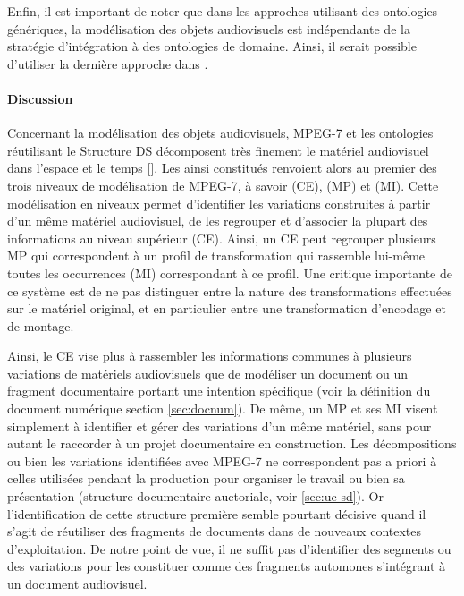 Enfin, il est important de noter que dans les approches utilisant des ontologies génériques, la modélisation des objets audiovisuels est indépendante de la stratégie d'intégration à des ontologies de domaine.
Ainsi, il serait possible d'utiliser la dernière approche dans .

\paragraph{Discussion}
Concernant la modélisation des objets audiovisuels, MPEG-7 et les ontologies réutilisant le Structure DS décomposent très finement le matériel audiovisuel dans l'espace et le temps [].
Les  ainsi constitués renvoient alors au premier des trois niveaux de modélisation de MPEG-7, à savoir  (CE),  (MP) et  (MI).
Cette modélisation en niveaux permet d'identifier les variations construites à partir d'un même matériel audiovisuel, de les regrouper et d'associer la plupart des informations au niveau supérieur (CE).
Ainsi, un CE peut regrouper plusieurs MP qui correspondent à un profil de transformation qui rassemble lui-même toutes les occurrences (MI) correspondant à ce profil.
Une critique importante de ce système est de ne pas distinguer entre la nature des transformations effectuées sur le matériel original, et en particulier entre une transformation d'encodage et de montage.

Ainsi, le CE vise plus à rassembler les informations communes à plusieurs variations de matériels audiovisuels que de modéliser un document ou un fragment documentaire portant une intention spécifique (voir la définition du document numérique section \ref{sec:docnum}).
De même, un MP et ses MI visent simplement à identifier et gérer des variations d'un même matériel, sans pour autant le raccorder à un projet documentaire en construction.
Les décompositions ou bien les variations identifiées avec MPEG-7 ne correspondent pas a priori à celles utilisées pendant la production pour organiser le travail ou bien sa présentation (structure documentaire auctoriale, voir \ref{sec:uc-sd}).
Or l'identification de cette structure première semble pourtant décisive quand il s'agit de réutiliser des fragments de documents dans de nouveaux contextes d'exploitation. 
De notre point de vue, il ne suffit pas d'identifier des segments ou des variations pour les constituer comme des fragments automones s'intégrant à un document audiovisuel.

